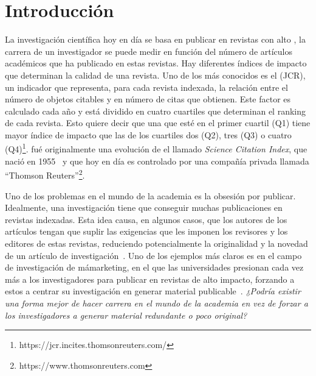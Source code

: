 \section{Introducción}

La investigación científica hoy en día se basa en publicar en revistas con alto
 \cite{doi:10.1001/jama.295.1.90}, la carrera de un
investigador se puede medir en función del número de artículos académicos que ha
publicado en estas revistas. Hay diferentes índices de impacto que determinan
la calidad de una revista. Uno de los más conocidos es el  (JCR), un indicador que representa, para cada revista indexada, la
relación entre el número de objetos citables y en número de citas que obtienen.
Este factor es calculado cada año y está dividido en cuatro cuartiles que
determinan el ranking de cada revista. Esto quiere decir que una que esté
en el primer cuartil (Q1) tiene mayor índice de impacto que las de los
cuartiles dos (Q2), tres (Q3) o cuatro
(Q4)\footnote{https://jcr.incites.thomsonreuters.com/}.  fué
originalmente una evolución de el llamado \emph{Science Citation Index}, que
nació en 1955~\cite{garfield2007evolution} y que hoy en día es controlado por
una compañía privada llamada ``Thomson
Reuters''\footnote{https://www.thomsonreuters.com}. 

Uno de los problemas en el mundo de la academia es la obsesión por publicar.
Idealmente, una investigación tiene que conseguir muchas publicaciones en
revistas indexadas. Esta idea causa, en algunos casos, que los autores de los
artículos tengan que suplir las exigencias que les imponen los revisores y los
editores de estas revistas, reduciendo potencialmente la originalidad y la
novedad de un artículo de investigación~\cite{Frey2003}. Uno de los ejemplos más
claros es en el campo de investigación de mámarketing, en el que las
universidades presionan cada vez más a los investigadores para publicar en
revistas de alto impacto, forzando a estos a centrar su investigación en generar
material publicable~\cite{ortinau2011writing}. \emph{ ¿Podría existir una forma
  mejor de hacer carrera en el mundo de la academia en vez de forzar a los
  investigadores a generar material redundante o poco original?}

